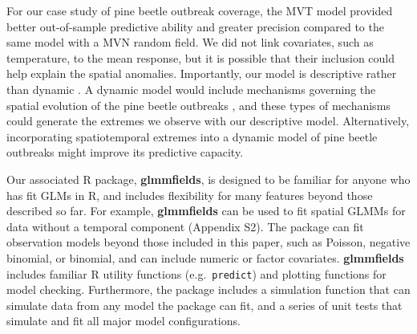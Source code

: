 \documentclass[12pt,english]{article}
\begin{document}
\begin{spacing}{1.8}


For our case study of pine beetle outbreak coverage, the MVT model provided
better out-of-sample predictive ability and greater precision compared to the
same model with a MVN random field. We did not link covariates, such as
temperature, to the mean response, but it is possible that their inclusion could
help explain the spatial anomalies. Importantly, our model is descriptive rather
than dynamic \citep{cressie2011}. A dynamic model would include mechanisms
governing the spatial evolution of the pine beetle outbreaks \citep[such as
available tree host size and quality,][]{chubaty2009}, and these types of
mechanisms could generate the extremes we observe with our descriptive model.
Alternatively, incorporating spatiotemporal extremes into a dynamic model of
pine beetle outbreaks might improve its predictive capacity.

Our associated R package, \textbf{glmmfields}, is designed to be familiar for
anyone who has fit GLMs in R, and includes flexibility for many features beyond
those described so far. For example, \textbf{glmmfields} can be used to fit
spatial GLMMs for data without a temporal component (Appendix S2). The package
can fit observation models beyond those included in this paper, such as Poisson,
negative binomial, or binomial, and can include numeric or factor covariates.
\textbf{glmmfields} includes familiar R utility functions (e.g.\
\texttt{predict}) and plotting functions for model checking. Furthermore, the
package includes a simulation function that can simulate data from any model the
package can fit, and a series of unit tests that simulate and fit all major
model configurations.


\end{spacing}
\end{document}

